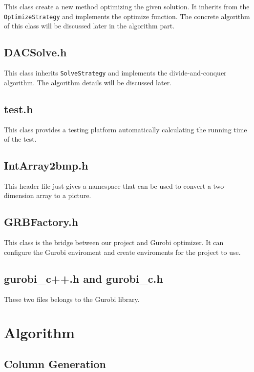 \documentclass[12pt, a4paper]{article}
\begin{document}
			This class create a new method optimizing the given solution. It inherits from the \texttt{OptimizeStrategy} and implements the optimize function. The concrete algorithm of this class will be discussed later in the algorithm part.
		
		\subsection{DACSolve.h}
		
			This class inherits \texttt{SolveStrategy} and implements the divide-and-conquer algorithm. The algorithm details will be discussed later.
		
		\subsection{test.h}
		
			This class provides a testing platform automatically calculating the running time of the test.

		\subsection{IntArray2bmp.h}

			This header file just gives a namespace that can be used to convert a two-dimension array to a picture.
		
		\subsection{GRBFactory.h}
		
			This class is the bridge between our project and Gurobi optimizer. It can configure the Gurobi enviroment and create enviroments for the project to use.
		
		\subsection{gurobi\_c++.h and gurobi\_c.h}
		
			These two files belongs to the Gurobi library.

	\section{Algorithm}
	
	\subsection{Column Generation}
	
\end{document}
